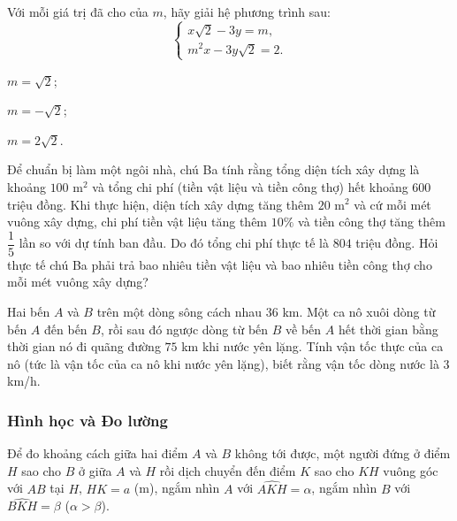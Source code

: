 \begin{exercises}
\begin{questions}[series=SGK]
        \item Với mỗi giá trị đã cho của $m$, hãy giải hệ phương trình sau:
        \[
            \begin{cases}
                x\sqrt{2}-3y=m,\\
                m^2x-3y\sqrt{2}=2.
            \end{cases}
        \]
        \begin{questions}
            \item $m=\sqrt{2}$;
            \answerline
            \item $m=-\sqrt{2}$;
            \answerline
            \item $m=2\sqrt{2}$.
            \answerline
        \end{questions}

        \item Để chuẩn bị làm một ngôi nhà, chú Ba tính rằng tổng diện tích xây dựng là khoảng $100$ m$^2$ và tổng chi phí (tiền vật liệu và tiền công thợ) hết khoảng $600$ triệu đồng. Khi thực hiện, diện tích xây dựng tăng thêm $20$ m$^2$ và cứ mỗi mét vuông xây dựng, chi phí tiền vật liệu tăng thêm $10\%$ và tiền công thợ tăng thêm $\dfrac{1}{5}$ lần so với dự tính ban đầu. Do đó tổng chi phí thực tế là $804$ triệu đồng. Hỏi thực tế chú Ba phải trả bao nhiêu tiền vật liệu và bao nhiêu tiền công thợ cho mỗi mét vuông xây dựng?
        \answerline
        \answerline
        \answerline

        \item Hai bến $A$ và $B$ trên một dòng sông cách nhau $36$ km. Một ca nô xuôi dòng từ bến $A$ đến bến $B$, rồi sau đó ngược dòng từ bến $B$ về bến $A$ hết thời gian bằng thời gian nó đi quãng đường $75$ km khi nước yên lặng. Tính vận tốc thực của ca nô (tức là vận tốc của ca nô khi nước yên lặng), biết rằng vận tốc dòng nước là $3$ km/h.
        \answerline
        \answerline
    \end{questions}

    \subsubsection*{Hình học và Đo lường}

    \begin{questions}[resume=SGK]
        \item Để đo khoảng cách giữa hai điểm $A$ và $B$ không tới được, một người đứng ở điểm $H$ sao cho $B$ ở giữa $A$ và $H$ rồi dịch chuyển đến điểm $K$ sao cho $KH$ vuông góc với $AB$ tại $H$, $HK=a$ (m), ngắm nhìn $A$ với $\widehat{AKH}=\alpha$, ngắm nhìn $B$ với $\widehat{BKH}=\beta$ ($\alpha>\beta$).


\end{questions}
\end{exercises}

